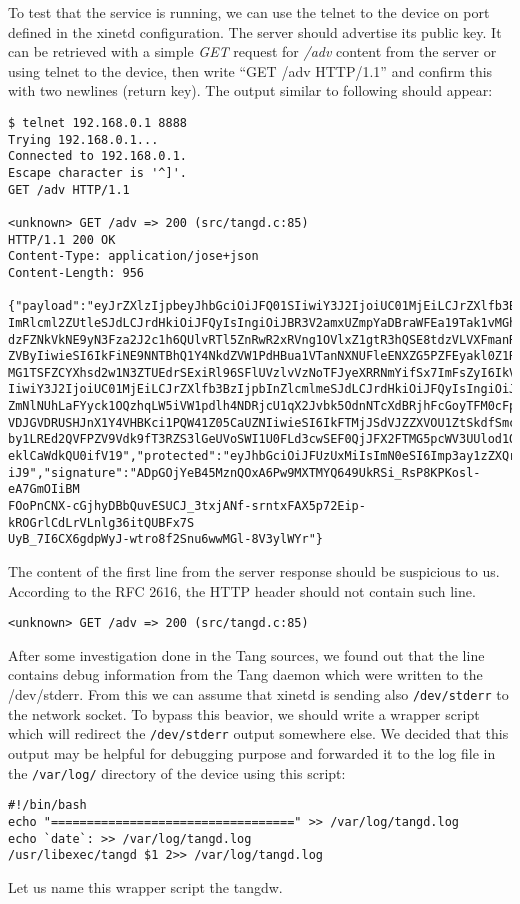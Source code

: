 To test that the service is running, we can use the telnet to the device on port defined in the xinetd configuration.
The server should advertise its public key.
It can be retrieved with a simple {\it GET} request for {\it /adv} content from the server or using telnet to the device, then write “GET /adv HTTP/1.1” and confirm this with two newlines (return key).
The output similar to following should appear:
\begin{lstlisting}[columns=fixed,basicstyle=\ttfamily\footnotesize,tabsize=4,backgroundcolor=\color{yellow!10}]
$ telnet 192.168.0.1 8888
Trying 192.168.0.1...
Connected to 192.168.0.1.
Escape character is '^]'.
GET /adv HTTP/1.1

<unknown> GET /adv => 200 (src/tangd.c:85)
HTTP/1.1 200 OK
Content-Type: application/jose+json
Content-Length: 956

{"payload":"eyJrZXlzIjpbeyJhbGciOiJFQ01SIiwiY3J2IjoiUC01MjEiLCJrZXlfb3BzIjpb
ImRlcml2ZUtleSJdLCJrdHkiOiJFQyIsIngiOiJBR3V2amxUZmpYaDBraWFEa19Tak1vMGhYUm1R
dzFZNkVkNE9yN3Fza2J2c1h6QUlvRTl5ZnRwR2xRVng1OVlxZ1gtR3hQSE8tdzVLVXFmanRGQkVV
ZVByIiwieSI6IkFiNE9NNTBhQ1Y4NkdZVW1PdHBua1VTanNXNUFleENXZG5PZFEyakl0Z1RGNXNq
MG1TSFZCYXhsd2w1N3ZTUEdrSExiRl96SFlUVzlvVzNoTFJyeXRRNmYifSx7ImFsZyI6IkVTNTEy
IiwiY3J2IjoiUC01MjEiLCJrZXlfb3BzIjpbInZlcmlmeSJdLCJrdHkiOiJFQyIsIngiOiJBQVpS
ZmNlNUhLaFYyck1OQzhqLW5iVW1pdlh4NDRjcU1qX2Jvbk5OdnNTcXdBRjhFcGoyTFM0cFpfdUNR
VDJGVDRUSHJnX1Y4VHBKci1PQW41Z05CaUZNIiwieSI6IkFTMjJSdVJZZXVOU1ZtSkdfSmcwSW1n
by1LREd2QVFPZV9Vdk9fT3RZS3lGeUVoSWI1U0FLd3cwSEF0QjJFX2FTMG5pcWV3UUlod1QyanR5
eklCaWdkQU0ifV19","protected":"eyJhbGciOiJFUzUxMiIsImN0eSI6Imp3ay1zZXQranNvb
iJ9","signature":"ADpGOjYeB45MznQOxA6Pw9MXTMYQ649UkRSi_RsP8KPKosl-eA7GmOIiBM
FOoPnCNX-cGjhyDBbQuvESUCJ_3txjANf-srntxFAX5p72Eip-kROGrlCdLrVLnlg36itQUBFx7S
UyB_7I6CX6gdpWyJ-wtro8f2Snu6wwMGl-8V3ylWYr"}
\end{lstlisting}
The content of the first line from the server response should be suspicious to us.
According to the RFC 2616, the HTTP header should not contain such line\cite{RFC2616}.
\begin{lstlisting}[columns=fixed,basicstyle=\ttfamily\footnotesize,tabsize=4,backgroundcolor=\color{yellow!10}]
<unknown> GET /adv => 200 (src/tangd.c:85)
\end{lstlisting}
After some investigation done in the Tang sources, we found out that the line contains debug information from the Tang daemon which were written to the /dev/stderr.
From this we can assume that xinetd is sending also {\tt /dev/stderr} to the network socket.
To bypass this beavior, we should write a wrapper script which will redirect the {\tt /dev/stderr} output somewhere else.
We decided that this output may be helpful for debugging purpose and forwarded it to the log file in the {\tt /var/log/} directory of the device using this script:
\begin{lstlisting}[columns=fixed,basicstyle=\ttfamily\footnotesize,tabsize=4,backgroundcolor=\color{yellow!10}]
#!/bin/bash
echo "==================================" >> /var/log/tangd.log
echo `date`: >> /var/log/tangd.log
/usr/libexec/tangd $1 2>> /var/log/tangd.log
\end{lstlisting}
Let us name this wrapper script the tangdw.

